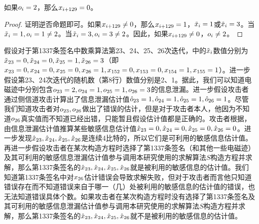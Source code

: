 {	\begin{corollary}\label{cor:lowbitinfo}
		如果$o_i=2$，那么$x_{i+129}=0$。
	\end{corollary}
	\begin{proof}
		证明逆否命题即可。如果$x_{i+129}\neq0$，那么$x_{i+129}=1$，$\tilde {x}_i=1$或$\tilde {x}_i=3$。当$\tilde {x}_i=1,o_i=1\neq2$。当$\tilde {x}_i=3,o_i=3\neq2$。因此，如果$x_{i+129}\neq0$，$o_i\neq2$。
	\end{proof}
	
	\begin{example}\label{ex:rightwrongright}
		假设对于第1337条签名中数乘算法第23、24、25、26次迭代，中的$\tilde{x}_i$数值分别为$\tilde{x}_{23}=0,\tilde{x}_{24}=0,\tilde{x}_{25}=1,\tilde{x}_{26}=3$（即$x_{23}=0,x_{24}=0,x_{25}=0,x_{26}=1,x_{152}=0,x_{153}=0,x_{154}=1,x_{155}=1$）。进一步假设第23、24次迭代的随机数（第8行）数值分别是2、1。据此，我们可以知道电磁迹中分别包含$o_{23}=2,o_{24}=1,o_{25}=1,o_{26}=3$的信息泄漏。进一步假设攻击者通过侧信道攻击计算出了信息泄漏估计值$\hat{o}_{23}=1,\hat{o}_{24}=1,\hat{o}_{25}=1,\hat{o}_{26}=1$。尽管我们知道攻击者对$o_{23},o_{26}$做出了错误的估计，但是对于攻击者本人，他因为不知道$o_{26}$真实值而不知道已经出错，只能暂且假设估计值都是正确的。攻击者根据，由信息泄漏估计值推算某些敏感信息估计值$\hat{x}_{23}=0,\hat{x}_{24}=0,\hat{x}_{25}=0,\hat{x}_{26}=0$。进一步发现$\hat{x}_{23},\hat{x}_{24},\hat{x}_{25},\hat{x}_{26}$是连续4比特的，所以它们是可利用的敏感信息估计值。再进一步假设攻击者在某次构造方程时选择了第1337条签名（和其他一些电磁迹）及其可利用的敏感信息泄漏估计值参与调用本研究使用的求解算法$S$构造方程并求解，那么第1337条签名的$\hat{x}_{23},\hat{x}_{24},\hat{x}_{25},\hat{x}_{26}$就是被利用的敏感信息的估计值。我们知道第1337条签名中对$x_{26}$估计错误会导致求解失败，但对于攻击者而言他只知道错误存在而不知道错误来自于哪一（几）处被利用的敏感信息的估计值的错误，也无法知道错误具体个数。如果攻击者在某次构造方程时没有选择了第1337条签名及其可利用的敏感信息泄漏估计值参与调用本研究使用的求解算法$S$构造方程并求解，那么第1337条签名的$\hat{x}_{23},\hat{x}_{24},\hat{x}_{25},\hat{x}_{26}$就不是被利用的敏感信息的估计值。
	\end{example}

}
